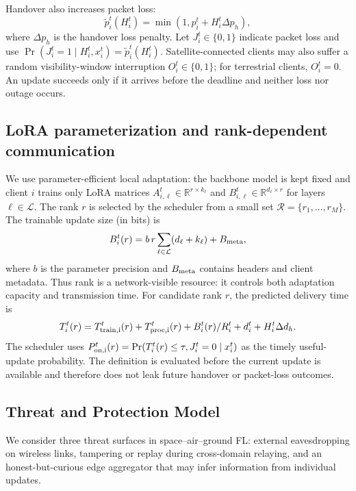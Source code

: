 \documentclass[preprint,12pt]{elsarticle}
\begin{document}
Handover also increases packet loss:
\begin{equation}
	\tilde{p}_i^t(H_i^t) = \min \left(1, p_i^t + H_i^t \Delta p_h \right),
	\label{eq:handover_loss}
\end{equation}
where $\Delta p_h$ is the handover loss penalty. Let $J_i^t\in\{0,1\}$ indicate packet loss and use $\Pr(J_i^t=1\mid H_i^t,x_i^t)=\tilde p_i^t(H_i^t)$. Satellite-connected clients may also suffer a random visibility-window interruption $O_i^t\in\{0,1\}$; for terrestrial clients, $O_i^t=0$. An update succeeds only if it arrives before the deadline and neither loss nor outage occurs.

\subsection{LoRA parameterization and rank-dependent communication}
We use parameter-efficient local adaptation: the backbone model is kept fixed and client $i$ trains only LoRA matrices $A_{i,\ell}^t\in\mathbb{R}^{r\times k_\ell}$ and $B_{i,\ell}^t\in\mathbb{R}^{d_\ell\times r}$ for layers $\ell\in\mathcal L$. The rank $r$ is selected by the scheduler from a small set $\mathcal R=\{r_1,\ldots,r_M\}$. The trainable update size (in bits) is
\begin{equation}
 B_i^t(r)=b\,r\sum_{\ell\in\mathcal L}(d_\ell+k_\ell)+B_{\rm meta},
 \label{eq:lora_size}
\end{equation}
where $b$ is the parameter precision and $B_{\rm meta}$ contains headers and client metadata. Thus rank is a network-visible resource: it controls both adaptation capacity and transmission time. For candidate rank $r$, the predicted delivery time is
\begin{equation}
 T_i^t(r)=T_{\rm train,i}^t(r)+T_{\rm proc,i}^t(r)+B_i^t(r)/R_i^t+d_i^t+H_i^t\Delta d_h.
 \label{eq:lora_delivery}
\end{equation}
The scheduler uses $P_{\rm on,i}^t(r)=\Pr(T_i^t(r)\leq\tau, J_i^t=0\mid x_i^t)$ as the timely useful-update probability. The definition is evaluated before the current update is available and therefore does not leak future handover or packet-loss outcomes.

\subsection{Threat and Protection Model}
\label{sec:threat}

We consider three threat surfaces in space--air--ground FL: external eavesdropping on wireless links, tampering or replay during cross-domain relaying, and an honest-but-curious edge aggregator that may infer information from individual updates.
\end{document}
